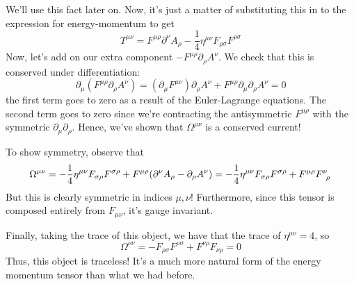 We'll use this fact later on. Now, it's just a matter of substituting this in to the expression for energy-momentum to get
\[ 
T^{ \mu\nu } = F^{ \mu \rho } \partial^\nu A_\rho - \frac{1}{4} \eta^{ \mu \nu} F_{ \rho \sigma} F^{ \rho \sigma} 
\] 
Now, let's add on our extra component $ - F^{ \mu \rho } \partial_\rho A^\nu$. We check that this is conserved under differentiation: 
\[ 
\partial_\mu (F^{\mu \rho} \partial_\rho A^\nu ) = (\partial_\mu F^{ \mu \nu}) \partial_\rho A^\nu  + F^{ \mu \rho} \partial_\mu \partial_\rho A^\nu  = 0 \] 
the first term goes to zero as a result of the Euler-Lagrange equations. The second term goes to zero since we're contracting the antisymmetric $F^{ \mu \rho} $ with the symmetric $\partial_\mu \partial_\rho$.  
Hence, we've shown that $\Omega^{ \mu \nu} $ is a conserved current! 

To show symmetry, observe that 
\[ 
\Omega^{ \mu \nu} = -  \frac{1}{4} \eta^{ \mu \nu} F_{ \sigma\rho} F^{ \sigma \rho} + F^{ \mu \rho} ( \partial^\nu A_ \rho - \partial_\rho A^\nu) = 
- \frac{1}{4} \eta^{ \mu \nu} F_{ \sigma\rho} F^{ \sigma \rho} + F^{ \mu \rho}F\indices{^\nu_\rho} \] 
But this is clearly symmetric in indices $\mu, \nu$! Furthermore, since this tensor is composed entirely from $F_{\mu \nu}$, it's gauge invariant. 

Finally, taking the trace of this object, we have that the trace of $\eta^{\mu \nu} = 4 $, so 
\[ 
\Omega^{ \nu \nu} =  - F_{\rho\sigma} F^{ \rho\sigma} + F^{ \nu \rho} F_{\nu \rho} = 0
\] 
Thus, this object is traceless! It's a much more natural form of the energy momentum tensor than what we had before. 

\pagebreak 
